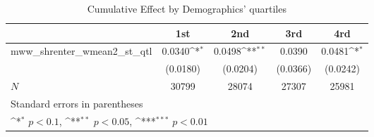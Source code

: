 \begin{table}[htbp]\centering
\def\sym#1{\ifmmode^{#1}\else\(^{#1}\)\fi}
\caption{Cumulative Effect by Demographics' quartiles}
\begin{tabular}{l*{4}{c}}
\hline\hline
            &\multicolumn{1}{c}{1st}&\multicolumn{1}{c}{2nd}&\multicolumn{1}{c}{3rd}&\multicolumn{1}{c}{4rd}\\
\hline
mww\_shrenter\_wmean2\_st\_qtl&      0.0340\sym{*}  &      0.0498\sym{**} &      0.0390         &      0.0481\sym{*}  \\
            &    (0.0180)         &    (0.0204)         &    (0.0366)         &    (0.0242)         \\
\hline
\(N\)       &       30799         &       28074         &       27307         &       25981         \\
\hline\hline
\multicolumn{5}{l}{\footnotesize Standard errors in parentheses}\\
\multicolumn{5}{l}{\footnotesize \sym{*} \(p<0.1\), \sym{**} \(p<0.05\), \sym{***} \(p<0.01\)}\\
\end{tabular}
\end{table}
